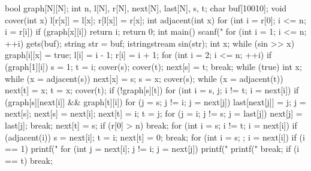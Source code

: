 bool graph[N][N];
int n, l[N], r[N], next[N], last[N], s, t;
char buf[10010];
void cover(int x) { l[r[x]] = l[x]; r[l[x]] = r[x]; }
int adjacent(int x) {
	for (int i = r[0]; i <= n; i = r[i]) if (graph[x][i]) return i;
	return 0;
}
int main() {
	scanf("%
	for (int i = 1; i <= n; ++i) {
		gets(buf);
		string str = buf;
		istringstream sin(str);
		int x;
		while (sin >> x) {
			graph[i][x] = true;
		}
		l[i] = i - 1;
		r[i] = i + 1;
	}
	for (int i = 2; i <= n; ++i)
		if (graph[1][i]) {
			s = 1;
			t = i;
			cover(s);
			cover(t);
			next[s] = t;
			break;
		}
	while (true) {
		int x;
		while (x = adjacent(s)) {
			next[x] = s;
			s = x;
			cover(s);
		}
		while (x = adjacent(t)) {
			next[t] = x;
			t = x;
			cover(t);
		}
		if (!graph[s][t]) {
			for (int i = s, j; i != t; i = next[i])
				if (graph[s][next[i]] && graph[t][i]) {
					for (j = s; j != i; j = next[j])
						last[next[j]] = j;
					j = next[s];
					next[s] = next[i];
					next[t] = i;
					t = j;
					for (j = i; j != s; j = last[j])
						next[j] = last[j];
					break;
				}
		}
		next[t] = s;
		if (r[0] > n)
			break;
		for (int i = s; i != t; i = next[i])
			if (adjacent(i)) {
				s = next[i];
				t = i;
				next[t] = 0;
				break;
			}
	}
	for (int i = s; ; i = next[i]) {
		if (i == 1) {
			printf("%
			for (int j = next[i]; j != i; j = next[j])
				printf(" %
			printf(" %
			break;
		}
		if (i == t)
			break;
	}
}
